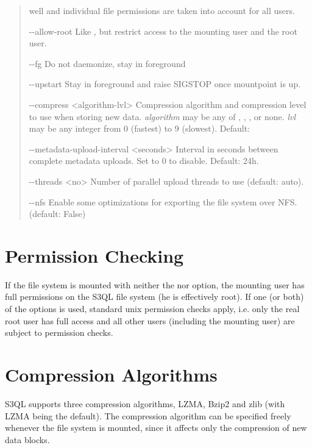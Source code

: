 \documentclass[letterpaper,10pt,english]{sphinxmanual}
\begin{document}
\begin{quote}
\begin{optionlist}{3cm}
well and individual file permissions are taken into
account for all users.
\item [-{-}allow-root]  
Like , but restrict access to the
mounting user and the root user.
\item [-{-}fg]  
Do not daemonize, stay in foreground
\item [-{-}upstart]  
Stay in foreground and raise SIGSTOP once mountpoint
is up.
\item [-{-}compress \textless{}algorithm-lvl\textgreater{}]  
Compression algorithm and compression level to use
when storing new data. \emph{algorithm} may be any of
, , , or none. \emph{lvl} may be any
integer from 0 (fastest) to 9 (slowest). Default:
\item [-{-}metadata-upload-interval \textless{}seconds\textgreater{}]  
Interval in seconds between complete metadata uploads.
Set to 0 to disable. Default: 24h.
\item [-{-}threads \textless{}no\textgreater{}]  
Number of parallel upload threads to use (default:
auto).
\item [-{-}nfs]  
Enable some optimizations for exporting the file
system over NFS. (default: False)
\end{optionlist}
\end{quote}


\section{Permission Checking}
\label{mount:permission-checking}
If the file system is mounted with neither the 
nor  option, the mounting user has full
permissions on the S3QL file system (he is effectively root). If one
(or both) of the options is used, standard unix permission checks
apply, i.e. only the real root user has full access and all other
users (including the mounting user) are subject to permission checks.


\section{Compression Algorithms}
\label{mount:compression-algorithms}
S3QL supports three compression algorithms, LZMA, Bzip2 and zlib (with
LZMA being the default). The compression algorithm can be specified
freely whenever the file system is mounted, since it affects only the
compression of new data blocks.
\end{document}
